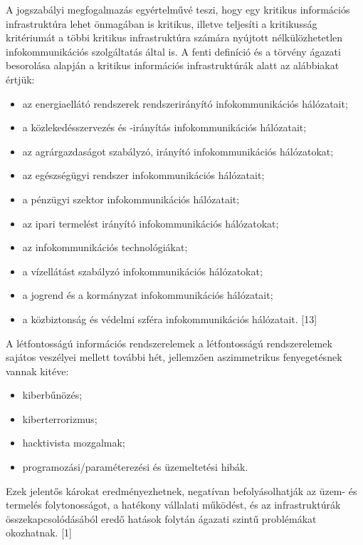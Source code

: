 \documentclass[12pt,magyar,a4paper,oneside]{scrreprt}
\providecommand{\tightlist}{%
  \setlength{\itemsep}{0pt}\setlength{\parskip}{0pt}}
\begin{document}
A jogszabályi megfogalmazás egyértelművé teszi, hogy egy kritikus
információs infrastruktúra lehet önmagában is kritikus, illetve
teljesíti a kritikusság kritériumát a többi kritikus infrastruktúra
számára nyújtott nélkülözhetetlen infokommunikációs szolgáltatás által
is. A fenti definíció és a törvény ágazati besorolása alapján a kritikus
információs infrastruktúrák alatt az alábbiakat értjük:

\begin{itemize}
\tightlist
\item
  az energiaellátó rendszerek rendszerirányító infokommunikációs
  hálózatait;
\item
  a közlekedésszervezés és -irányítás infokommunikációs hálózatait;
\item
  az agrárgazdaságot szabályzó, irányító infokommunikációs hálózatokat;
\item
  az egészségügyi rendszer infokommunikációs hálózatait;
\item
  a pénzügyi szektor infokommunikációs hálózatait;
\item
  az ipari termelést irányító infokommunikációs hálózatokat;
\item
  az infokommunikációs technológiákat;
\item
  a vízellátást szabályzó infokommunikációs hálózatokat;
\item
  a jogrend és a kormányzat infokommunikációs hálózatait;
\item
  a közbiztonság és védelmi szféra infokommunikációs hálózatait.
  {[}13{]}
\end{itemize}

A létfontosságú információs rendszerelemek a létfontosságú
rendszerelemek sajátos veszélyei mellett további hét, jellemzően
aszimmetrikus fenyegetésnek vannak kitéve:

\begin{itemize}
\tightlist
\item
  kiberbűnözés;
\item
  kiberterrorizmus;
\item
  hacktivista mozgalmak;
\item
  programozási/paraméterezési és üzemeltetési hibák.
\end{itemize}

Ezek jelentős károkat eredményezhetnek, negatívan befolyásolhatják az
üzem- és termelés folytonosságot, a hatékony vállalati működést, és az
infrastruktúrák összekapcsolódásából eredő hatások folytán ágazati
szintű problémákat okozhatnak. {[}1{]}
\end{document}
